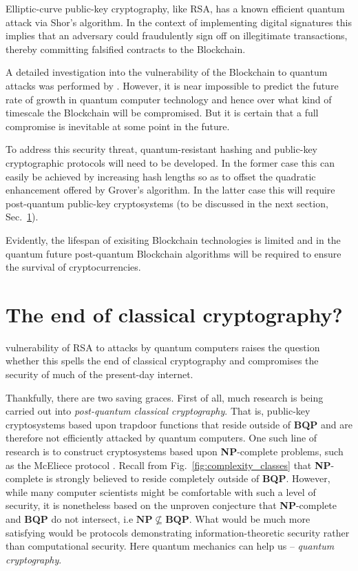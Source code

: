Elliptic-curve public-key cryptography, like RSA, has a known efficient quantum attack via Shor's algorithm. In the context of implementing digital signatures this implies that an adversary could fraudulently sign off on illegitimate transactions, thereby committing falsified contracts to the Blockchain.

A detailed investigation into the vulnerability of the Blockchain to quantum attacks was performed by \cite{bib:TomamichelBlockchain}. However, it is near impossible to predict the future rate of growth in quantum computer technology and hence over what kind of timescale the Blockchain will be compromised. But it is certain that a full compromise is inevitable at some point in the future.

To address this security threat, quantum-resistant hashing and public-key cryptographic protocols will need to be developed. In the former case this can easily be achieved by increasing hash lengths so as to offset the quadratic enhancement offered by Grover's algorithm. In the latter case this will require post-quantum public-key cryptosystems (to be discussed in the next section, Sec.~\ref{sec:end_of_class_crypto}).

Evidently, the lifespan of exisiting Blockchain technologies is limited and in the quantum future post-quantum Blockchain algorithms will be required to ensure the survival of cryptocurrencies.

%
%

\section{The end of classical cryptography?} \label{sec:end_of_class_crypto}

 vulnerability of RSA to attacks by quantum computers raises the question whether this spells the end of classical cryptography and compromises the security of much of the present-day internet.

Thankfully, there are two saving graces. First of all, much research is being carried out into \textit{post-quantum classical cryptography}. That is, public-key cryptosystems based upon trapdoor functions that reside outside of \textbf{BQP} and are therefore not efficiently attacked by quantum computers. One such line of research is to construct cryptosystems based upon \textbf{NP}-complete problems, such as the McEliece protocol \cite{bib:McEliece}. Recall from Fig.~\ref{fig:complexity_classes} that \textbf{NP}-complete is strongly believed to reside completely outside of \textbf{BQP}. However, while many computer scientists might be comfortable with such a level of security, it is nonetheless based on the unproven conjecture that \textbf{NP}-complete and \textbf{BQP} do not intersect, i.e \mbox{$\mathbf{NP}\nsubseteq\mathbf{BQP}$}. What would be much more satisfying would be protocols demonstrating information-theoretic security rather than computational security. Here quantum mechanics can help us -- \textit{quantum cryptography}.

